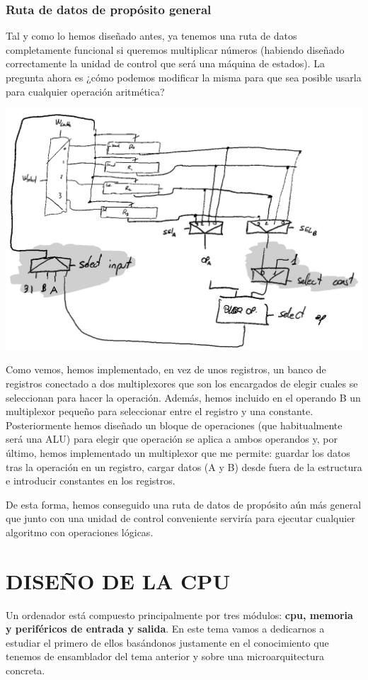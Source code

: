 \documentclass[a4paper,10pt]{book}
\begin{document}
\subsubsection*{Ruta de datos de propósito general}
Tal y como lo hemos diseñado antes, ya tenemos una ruta de datos completamente funcional si queremos multiplicar números (habiendo diseñado correctamente la unidad de control que será una máquina de estados). La pregunta ahora es ¿cómo podemos modificar la misma para que sea posible usarla para cualquier operación aritmética?
\begin{center}
\includegraphics[scale=1]{ruta de datos general}
\end{center}
Como vemos, hemos implementado, en vez de unos registros, un banco de registros conectado a dos multiplexores que son los encargados de elegir cuales se seleccionan para hacer la operación. Además, hemos incluido en el operando B un multiplexor pequeño para seleccionar entre el registro y una constante. Posteriormente hemos diseñado un bloque de operaciones (que habitualmente será una ALU) para elegir que operación se aplica a ambos operandos y, por último, hemos implementado un multiplexor que me permite: guardar los datos tras la operación en un registro, cargar datos (A y B) desde fuera de la estructura e introducir constantes en los registros.

De esta forma, hemos conseguido una ruta de datos de propósito aún más general que junto con una unidad de control conveniente serviría para ejecutar cualquier algoritmo con operaciones lógicas.

\section*{DISEÑO DE LA CPU}
Un ordenador está compuesto principalmente por tres módulos: \textbf{cpu, memoria y periféricos de entrada y salida}. En este tema vamos a dedicarnos a estudiar el primero de ellos basándonos justamente en el conocimiento que tenemos de ensamblador del tema anterior y sobre una microarquitectura concreta.
\end{document}
